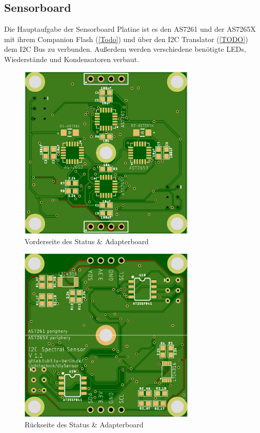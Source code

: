 \subsection{Sensorboard}
Die Hauptaufgabe der Sensorboard Platine ist es den AS7261 und der AS7265X mit ihrem Companion Flash (\ref{Todo}) und über den I2C Translator (\ref{TODO}) dem I2C Bus zu verbunden.
Außerdem werden verschiedene benötigte LEDs, Wiederstände und Kondensatoren verbaut.

\begin{figure}[H]
\centering
\includegraphics[width=0.75\textwidth]{img/Sensor-platiene_front}
\caption{Vorderseite des Status \& Adapterboard}
\label{fig:Sensor-platiene_front}
\end{figure}

\begin{figure}[H]
\centering
\includegraphics[width=0.75\textwidth]{img/Sensor-platiene_back}
\caption{Rückseite des Status \& Adapterboard}
\label{fig:Sensor-platiene_back}
\end{figure}

